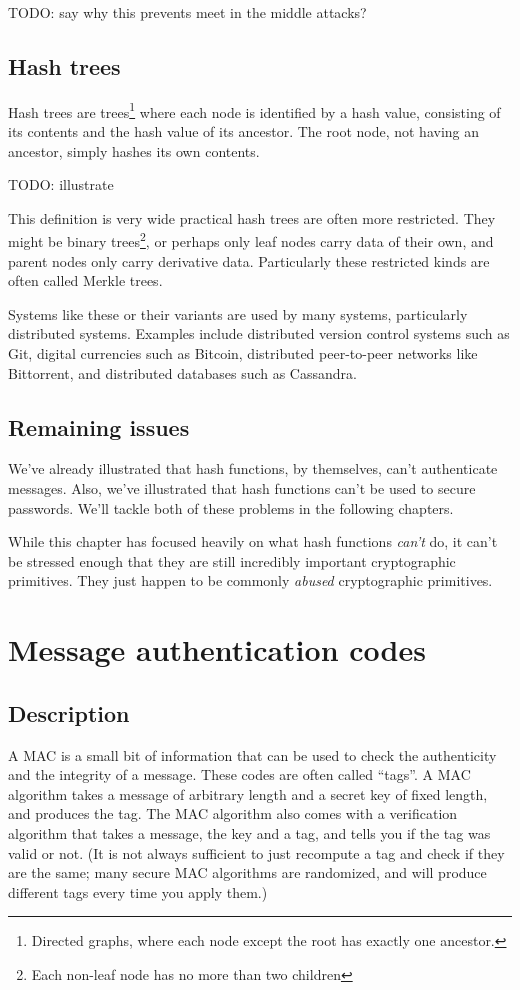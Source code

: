 \documentclass[11pt,ebook,table,dvipsnames]{memoir}
\begin{document}
TODO: say why this prevents meet in the middle attacks?
\section{Hash trees}
\label{sec-2-6-9}

Hash trees are trees\footnote{Directed graphs, where each node except the
root has exactly one ancestor.} where each node is identified by a
hash value, consisting of its contents and the hash value of its
ancestor. The root node, not having an ancestor, simply hashes its own
contents.

TODO: illustrate

This definition is very wide practical hash trees are often more
restricted. They might be binary trees\footnote{Each non-leaf node has no
more than two children}, or perhaps only leaf nodes carry data of
their own, and parent nodes only carry derivative data. Particularly
these restricted kinds are often called Merkle trees.

Systems like these or their variants are used by many systems,
particularly distributed systems. Examples include distributed version
control systems such as Git, digital currencies such as Bitcoin,
distributed peer-to-peer networks like Bittorrent, and distributed
databases such as Cassandra.
\section{Remaining issues}
\label{sec-2-6-10}

We've already illustrated that hash functions, by themselves, can't
authenticate messages. Also, we've illustrated that hash functions
can't be used to secure passwords. We'll tackle both of these
problems in the following chapters.

While this chapter has focused heavily on what hash functions \emph{can't}
do, it can't be stressed enough that they are still incredibly
important cryptographic primitives. They just happen to be commonly
\emph{abused} cryptographic primitives.
\chapter{Message authentication codes}
\label{sec-2-7}
\section{Description}
\label{sec-2-7-1}

A \Gls{MAC} is a small bit of information that can be used to check
the authenticity and the integrity of a message. These codes are often
called \enquote{tags}. A MAC algorithm takes a message of arbitrary length and
a secret key of fixed length, and produces the tag. The MAC algorithm
also comes with a verification algorithm that takes a message, the key
and a tag, and tells you if the tag was valid or not. (It is not
always sufficient to just recompute a tag and check if they are the
same; many secure MAC algorithms are randomized, and will produce
different tags every time you apply them.)
\end{document}
